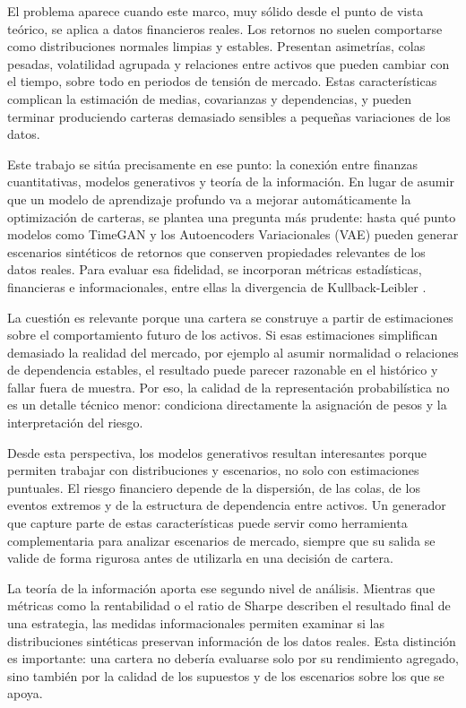 \documentclass[11pt,a4paper,spanish,oneside]{book}
\numberwithin{equation}{chapter}
\numberwithin{figure}{chapter}
\begin{document}
El problema aparece cuando este marco, muy sólido desde el punto de vista teórico, se aplica a datos financieros reales. Los retornos no suelen comportarse como distribuciones normales limpias y estables. Presentan asimetrías, colas pesadas, volatilidad agrupada y relaciones entre activos que pueden cambiar con el tiempo, sobre todo en periodos de tensión de mercado. Estas características complican la estimación de medias, covarianzas y dependencias, y pueden terminar produciendo carteras demasiado sensibles a pequeñas variaciones de los datos.

Este trabajo se sitúa precisamente en ese punto: la conexión entre finanzas cuantitativas, modelos generativos y teoría de la información. En lugar de asumir que un modelo de aprendizaje profundo va a mejorar automáticamente la optimización de carteras, se plantea una pregunta más prudente: hasta qué punto modelos como TimeGAN y los Autoencoders Variacionales (VAE) pueden generar escenarios sintéticos de retornos que conserven propiedades relevantes de los datos reales. Para evaluar esa fidelidad, se incorporan métricas estadísticas, financieras e informacionales, entre ellas la divergencia de Kullback-Leibler \cite{Kullback1951}.

La cuestión es relevante porque una cartera se construye a partir de estimaciones sobre el comportamiento futuro de los activos. Si esas estimaciones simplifican demasiado la realidad del mercado, por ejemplo al asumir normalidad o relaciones de dependencia estables, el resultado puede parecer razonable en el histórico y fallar fuera de muestra. Por eso, la calidad de la representación probabilística no es un detalle técnico menor: condiciona directamente la asignación de pesos y la interpretación del riesgo.

Desde esta perspectiva, los modelos generativos resultan interesantes porque permiten trabajar con distribuciones y escenarios, no solo con estimaciones puntuales. El riesgo financiero depende de la dispersión, de las colas, de los eventos extremos y de la estructura de dependencia entre activos. Un generador que capture parte de estas características puede servir como herramienta complementaria para analizar escenarios de mercado, siempre que su salida se valide de forma rigurosa antes de utilizarla en una decisión de cartera.

La teoría de la información aporta ese segundo nivel de análisis. Mientras que métricas como la rentabilidad o el ratio de Sharpe \cite{Sharpe1964} describen el resultado final de una estrategia, las medidas informacionales permiten examinar si las distribuciones sintéticas preservan información de los datos reales. Esta distinción es importante: una cartera no debería evaluarse solo por su rendimiento agregado, sino también por la calidad de los supuestos y de los escenarios sobre los que se apoya.
\end{document}
